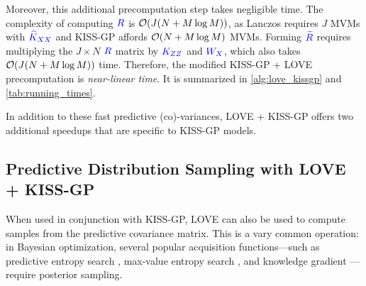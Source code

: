 Moreover, this additional precomputation step takes negligible time.
The complexity of computing $\color{blue} R$ is $\bigo{J(N + M \log M)}$, as Lanczos requires $J$ MVMs with $\color{blue} \widehat{K}_{XX}$ and KISS-GP affords $\bigo{N + M \log M}$ MVMs.
Forming $\color{blue} \widetilde {R}$ requires multiplying the $J \! \times \! N$ $\color{blue} R$ matrix by $\color{blue} K_{ZZ}$ and $\color{blue} W_{X}$, which also takes $\bigo{J(N + M \log M)}$ time.
Therefore, the modified KISS-GP + LOVE precomputation is \emph{near-linear time}.
It is summarized in \cref{alg:love_kissgp} and \cref{tab:running_times}.

In addition to these fast predictive (co)-variances, LOVE + KISS-GP offers two additional speedups that are specific to KISS-GP models.




\subsection{Predictive Distribution Sampling with LOVE{} + KISS-GP}
\label{sec:sampling_method}

When used in conjunction with KISS-GP, LOVE{} can also be used to compute samples from the predictive covariance matrix.
This is a vary common operation: in Bayesian optimization, several popular acquisition functions---such as predictive entropy search \cite{hernandez2014predictive}, max-value entropy search \cite{wang2017max}, and knowledge gradient \cite{frazier2009knowledge}---require posterior sampling.

